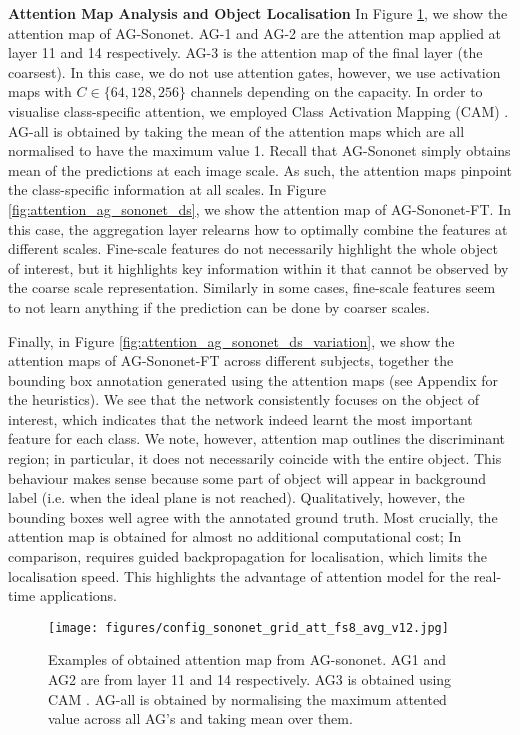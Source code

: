\documentclass{article}
\begin{document}
\textbf{Attention Map Analysis and Object Localisation} In Figure \ref{fig:attention_ag_sononet}, we show the attention map of AG-Sononet. AG-1 and AG-2 are the attention map applied at layer 11 and 14 respectively. AG-3 is the attention map of the final layer (the coarsest). In this case, we do not use attention gates, however, we use activation maps with $C \in \{64, 128, 256\}$ channels depending on the capacity. In order to visualise class-specific attention, we employed Class Activation Mapping (CAM) \cite{zhou2016learning}. AG-all is obtained by taking the mean of the attention maps which are all normalised to have the maximum value 1. Recall that AG-Sononet simply obtains mean of the predictions at each image scale. As such, the attention maps pinpoint the class-specific information at all scales. In Figure \ref{fig:attention_ag_sononet_ds}, we show the attention map of AG-Sononet-FT. In this case, the aggregation layer relearns how to optimally combine the features at different scales. Fine-scale features do not necessarily highlight the whole object of interest, but it highlights key information within it that cannot be observed by the coarse scale representation. Similarly in some cases, fine-scale features seem to not learn anything if the prediction can be done by coarser scales. 

Finally, in Figure \ref{fig:attention_ag_sononet_ds_variation}, we show the attention maps of AG-Sononet-FT across different subjects, together the bounding box annotation generated using the attention maps (see Appendix for the heuristics). We see that the network consistently focuses on the object of interest, which indicates that the network indeed learnt the most important feature for each class. We note, however, attention map outlines the discriminant region; in particular, it does not necessarily coincide with the entire object. This behaviour makes sense because some part of object will appear in background label (i.e. when the ideal plane is not reached). Qualitatively, however, the bounding boxes well agree with the annotated ground truth. Most crucially, the attention map is obtained for almost no additional computational cost; In comparison, \cite{baumgartner2016real} requires guided backpropagation for localisation, which limits the localisation speed. This highlights the advantage of attention model for the real-time applications.
   
\begin{figure}[!t]
	\centering
	\texttt{[image: figures/config\_sononet\_grid\_att\_fs8\_avg\_v12.jpg]}
	\caption{Examples of obtained attention map from AG-sononet. AG1 and AG2 are from layer 11 and 14 respectively. AG3 is obtained using CAM  \cite{zhou2016learning}. AG-all is obtained by normalising the maximum attented value across all AG's and taking mean over them.}
	\label{fig:attention_ag_sononet}
\end{figure}
\end{document}

